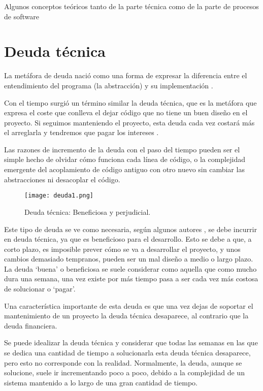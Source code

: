 
Algunos conceptos teóricos tanto de la parte técnica como de la parte de procesos de software


\section{Deuda técnica}

La metáfora de deuda nació como una forma de expresar la diferencia entre el entendimiento del programa (la abstracción) y su implementación \cite{cu09}.

Con el tiempo surgió un término similar la deuda técnica, que es la metáfora que expresa el coste que conlleva el dejar código que no tiene un buen diseño en el proyecto. Si seguimos manteniendo el proyecto, esta deuda cada vez costará más el arreglarla y tendremos que pagar los intereses \cite{fow03}.

Las razones de incremento de la deuda con el paso del tiempo pueden ser el simple hecho de olvidar cómo funciona cada línea de código, o la complejidad emergente del acoplamiento de código antiguo con otro nuevo sin cambiar las abstracciones ni desacoplar el código.

\begin{figure}
	\centering
	\texttt{[image: deuda1.png]}
	\caption[Deuda técnica: Beneficiosa y perjudicial]{Deuda técnica: Beneficiosa y perjudicial\cite{kni13}.}\label{fig:deuda1.png}
\end{figure}


Este tipo de deuda se ve como necesaria, según algunos autores \cite{kni13}, se debe incurrir en deuda técnica, ya que es beneficioso para el desarrollo. Esto se debe a que, a corto plazo, es imposible prever cómo se va a desarrollar el proyecto, y unos cambios demasiado tempranos, pueden ser un mal diseño a medio o largo plazo. La deuda `buena' o beneficiosa se suele considerar como aquella que como mucho dura una semana, una vez existe por más tiempo pasa a ser cada vez más costosa de solucionar o `pagar'.


Una característica importante de esta deuda es que una vez dejas de soportar el mantenimiento de un proyecto la deuda técnica desaparece, al contrario que la deuda financiera.

Se puede idealizar la deuda técnica y considerar que todas las semanas en las que se dedica una cantidad de tiempo a solucionarla esta deuda técnica desaparece, pero esto no corresponde con la realidad. Normalmente, la deuda, aunque se solucione, suele ir incrementando poco a poco, debido a la complejidad de un sistema mantenido a lo largo de una gran cantidad de tiempo.

